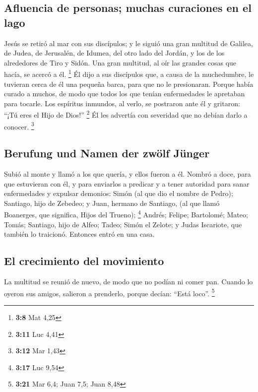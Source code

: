 \begin{paracol}{2}
{\subsection{Afluencia de personas; muchas curaciones en el
lago}\label{afluencia-de-personas-muchas-curaciones-en-el-lago}}

 Jesús se retiró al mar con sus discípulos; y le siguió
una gran multitud de Galilea, de Judea,  de Jerusalén, de
Idumea, del otro lado del Jordán, y los de los alrededores de Tiro y
Sidón. Una gran multitud, al oír las grandes cosas que hacía, se acercó
a él. \footnote{\textbf{3:8} Mat 4,25}  Él dijo a sus
discípulos que, a causa de la muchedumbre, le tuvieran cerca de él una
pequeña barca, para que no le presionaran.  Porque había
curado a muchos, de modo que todos los que tenían enfermedades le
apretaban para tocarle.  Los espíritus inmundos, al
verlo, se postraron ante él y gritaron: ``¡Tú eres el Hijo de Dios!''
\footnote{\textbf{3:11} Luc 4,41}  Él les advertía con
severidad que no debían darlo a conocer. \footnote{\textbf{3:12} Mar
  1,43}

\hypertarget{berufung-und-namen-der-zwuxf6lf-juxfcnger}{%
\subsection{Berufung und Namen der zwölf
Jünger}\label{berufung-und-namen-der-zwuxf6lf-juxfcnger}}

 Subió al monte y llamó a los que quería, y ellos fueron
a él.  Nombró a doce, para que estuvieran con él, y para
enviarlos a predicar  y a tener autoridad para sanar
enfermedades y expulsar demonios:  Simón (al que dio el
nombre de Pedro);  Santiago, hijo de Zebedeo; y Juan,
hermano de Santiago, (al que llamó Boanerges, que significa, Hijos del
Trueno); \footnote{\textbf{3:17} Luc 9,54}  Andrés;
Felipe; Bartolomé; Mateo; Tomás; Santiago, hijo de Alfeo; Tadeo; Simón
el Zelote;  y Judas Iscariote, que también lo traicionó.
Entonces entró en una casa.

\hypertarget{el-crecimiento-del-movimiento}{%
\subsection{El crecimiento del
movimiento}\label{el-crecimiento-del-movimiento}}

 La multitud se reunió de nuevo, de modo que no podían ni
comer pan.  Cuando lo oyeron sus amigos, salieron a
prenderlo, porque decían: ``Está loco''. \footnote{\textbf{3:21} Mar
  6,4; Juan 7,5; Juan 8,48}


\end{paracol}
